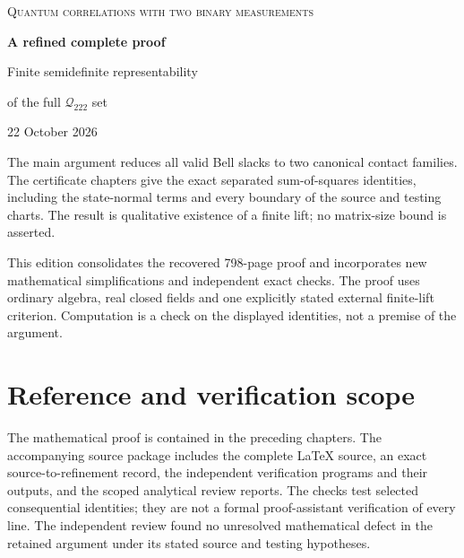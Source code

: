 \documentclass[10pt,a4paper,oneside,openany]{book}
\theoremstyle{definition}
\theoremstyle{remark}
\begin{document}
\frontmatter
\begin{titlepage}
\centering
\vspace*{25mm}
{\Large\scshape Quantum correlations with two binary measurements\par}
\vspace{12mm}
{\Huge\bfseries A refined complete proof\par}
\vspace{8mm}
{\LARGE Finite semidefinite representability\par}
\vspace{6mm}
{\Large of the full $\mathcal Q_{222}$ set\par}
\vspace{18mm}
{\large 22 October 2026\par}
\vfill
\begin{minipage}{0.88\textwidth}
The main argument reduces all valid Bell slacks to two canonical
contact families.  The certificate chapters give the exact separated
sum-of-squares identities, including the state-normal terms and every
boundary of the source and testing charts.  The result is qualitative
existence of a finite lift; no matrix-size bound is asserted.

\medskip
This edition consolidates the recovered 798-page proof and incorporates
new mathematical simplifications and independent exact checks.  The
proof uses ordinary algebra, real closed fields and one explicitly
stated external finite-lift criterion.  Computation is a check on the
displayed identities, not a premise of the argument.
\end{minipage}
\end{titlepage}
\tableofcontents
\mainmatter







\appendix

\backmatter
\chapter{Reference and verification scope}
The mathematical proof is contained in the preceding chapters.
The accompanying source package includes the complete LaTeX source,
an exact source-to-refinement record, the independent verification
programs and their outputs, and the scoped analytical review reports.
The checks test selected consequential identities; they are not a
formal proof-assistant verification of every line.  The independent
review found no unresolved mathematical defect in the retained
argument under its stated source and testing hypotheses.
\end{document}
